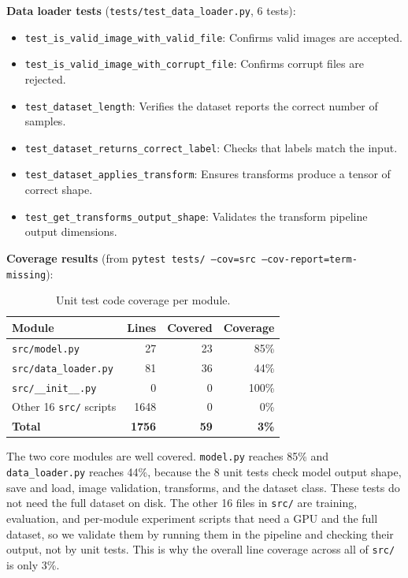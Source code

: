 \documentclass[10pt,twocolumn,letterpaper]{article}
\begin{document}
\textbf{Data loader tests} (\texttt{tests/test\_data\_loader.py}, 6 tests):
\begin{itemize}
    \item \texttt{test\_is\_valid\_image\_with\_valid\_file}: Confirms valid images are accepted.
    \item \texttt{test\_is\_valid\_image\_with\_corrupt\_file}: Confirms corrupt files are rejected.
    \item \texttt{test\_dataset\_length}: Verifies the dataset reports the correct number of samples.
    \item \texttt{test\_dataset\_returns\_correct\_label}: Checks that labels match the input.
    \item \texttt{test\_dataset\_applies\_transform}: Ensures transforms produce a tensor of correct shape.
    \item \texttt{test\_get\_transforms\_output\_shape}: Validates the transform pipeline output dimensions.
\end{itemize}

\textbf{Coverage results} (from \texttt{pytest tests/ --cov=src --cov-report=term-missing}):

\begin{table}[h]
\centering
\caption{Unit test code coverage per module.}
\label{tab:coverage}
\begin{tabular}{@{} l r r r @{}}
\toprule
\textbf{Module} & \textbf{Lines} & \textbf{Covered} & \textbf{Coverage} \\
\midrule
\texttt{src/model.py} & 27 & 23 & 85\% \\
\texttt{src/data\_loader.py} & 81 & 36 & 44\% \\
\texttt{src/\_\_init\_\_.py} & 0 & 0 & 100\% \\
Other 16 \texttt{src/} scripts & 1648 & 0 & 0\% \\
\midrule
\textbf{Total} & \textbf{1756} & \textbf{59} & \textbf{3\%} \\
\bottomrule
\end{tabular}
\end{table}

The two core modules are well covered. \texttt{model.py} reaches 85\% and \texttt{data\_loader.py} reaches 44\%, because the 8 unit tests check model output shape, save and load, image validation, transforms, and the dataset class. These tests do not need the full dataset on disk. The other 16 files in \texttt{src/} are training, evaluation, and per-module experiment scripts that need a GPU and the full dataset, so we validate them by running them in the pipeline and checking their output, not by unit tests. This is why the overall line coverage across all of \texttt{src/} is only 3\%.
\end{document}
